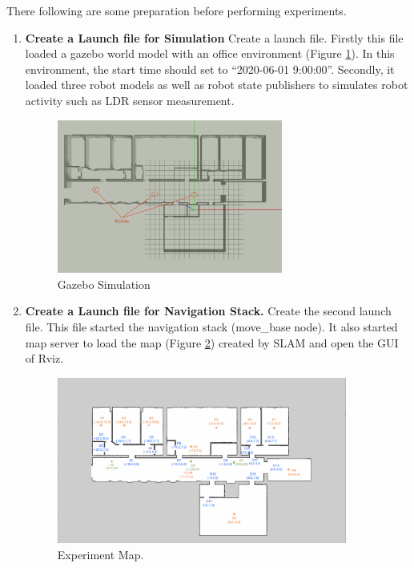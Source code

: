 There following are some preparation before performing experiments. 
\label{sec:experiment_set_up}
\begin{enumerate}
\item \textbf{Create a Launch file for Simulation} Create a launch file. Firstly this file loaded a gazebo world model with an office environment (Figure \ref{fig:gazebo_model}). In this environment, the start time should set to ``2020-06-01 9:00:00''. Secondly, it loaded three robot models as well as robot state publishers to simulates robot activity such as LDR sensor measurement.
\begin{figure}[htbp]
 \centering
 \includegraphics[width = 0.7\textwidth]{content/images/ch5/gazebo_model.png}
 \caption{Gazebo Simulation}
 \label{fig:gazebo_model}
\end{figure}

\item \textbf{Create a Launch file for Navigation Stack.} Create the second launch file. This file started the navigation stack (move\_base node). It also started map server to load the map (Figure \ref{fig:exp_map}) created by SLAM\cite{T3SLAM} and open the GUI of Rviz.  
\begin{figure}[htbp]
 \centering
 \includegraphics[width = 0.9\textwidth]{content/images/ch5/door_station_points.png}
 \caption{Experiment Map.}
 \label{fig:exp_map}
 \end{figure}


\end{enumerate}
